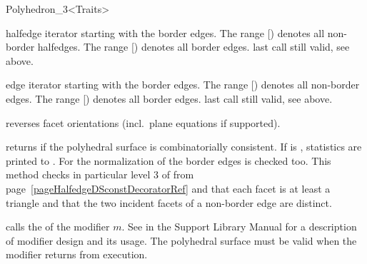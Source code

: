 \begin{ccRefClass}{Polyhedron_3<Traits>}
\begin{ccAdvanced}
    {halfedge iterator starting with the border edges. The range
      [) denotes
    all non-border halfedges. The range
    [) denotes all
    border edges.
    \ccPrecond last  call still valid, see above.}

    {edge iterator starting with the border edges. The range
      [) denotes
    all non-border edges. The range
    [) denotes all
    border edges.
    \ccPrecond last  call still valid, see above.}

\end{ccAdvanced}


    {reverses facet orientations (incl.\ plane equations if supported).}

   {returns  if the polyhedral surface is combinatorially 
    consistent. If  is , statistics are
    printed to . For  the normalization of the
    border edges is checked too. This method checks in particular level 3 of
     from
    page~\ref{pageHalfedgeDSconstDecoratorRef} and that each facet is at least
    a triangle and that the two incident facets of a non-border edge are
    distinct.}


\newpage
\begin{ccAdvanced}
    {calls the  of the modifier $m$. See
     in the Support Library Manual for a
    description of modifier design and its usage.
    \ccPrecond The polyhedral surface must be valid when the modifier
    returns from execution.}
\end{ccAdvanced}


\end{ccRefClass}
